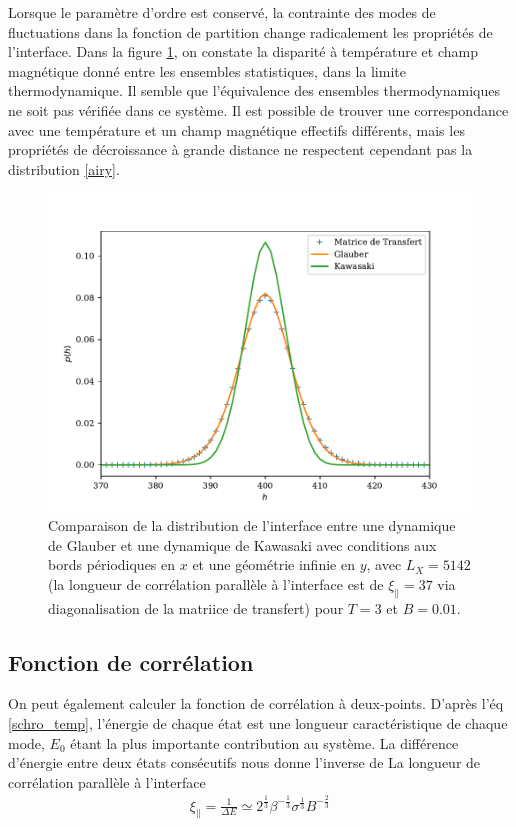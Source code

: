 Lorsque le paramètre d'ordre est conservé, la contrainte des modes de fluctuations dans la fonction de partition change radicalement les propriétés de l'interface. Dans la figure \ref{airy-eq-kae}, on constate la disparité à température et champ magnétique donné entre les ensembles statistiques, dans la limite thermodynamique. {\color{red}  Il semble que l'équivalence des ensembles thermodynamiques ne soit pas vérifiée dans ce système.} Il est possible de trouver une correspondance avec une température et un champ magnétique effectifs différents, mais les propriétés de décroissance à grande distance ne respectent cependant pas la distribution \ref{airy}. 
\begin{figure}
    \centering
	\includegraphics[width=0.5\linewidth]{sosequi-laser/comp-airy-kaw-glau.pdf}
	\caption{Comparaison de la distribution de l'interface entre une dynamique de Glauber et une dynamique de Kawasaki avec conditions aux bords périodiques en $x$ et une géométrie infinie en $y$, avec $L_X=5142$ (la longueur de corrélation parallèle à l'interface est de $\xi_\parallel = 37$ via diagonalisation de la matriice de transfert) pour $T=3$ et $B=0.01$. }
	\label{airy-eq-kae}
\end{figure}

    \subsection{Fonction de corrélation}

On peut également calculer la fonction de corrélation à deux-points. 
D'après l'éq \ref{schro_temp}, l'énergie de chaque état est une longueur caractéristique de chaque mode, $E_0$ étant la plus importante contribution au système. La différence d'énergie entre deux états consécutifs nous donne l'inverse de La longueur de corrélation parallèle à l'interface 
\begin{align}
	\xi_\parallel = \frac{1}{\Delta E} \simeq    2^\frac{1}{3}  \beta^{-\frac{1}{3}} \sigma^{\frac{1}{3}}B^{-\frac{2}{3}}
\end{align}


